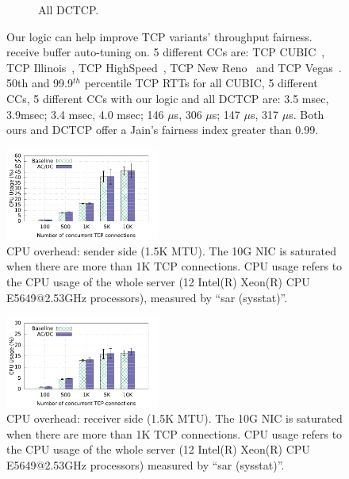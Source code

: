 \begin{figure}[!htb]
\begin{subfigure}[b]{0.24\textwidth}
                \caption{All DCTCP.}
                \label{fairness_5CC_with_ours}
        \end{subfigure}
	\caption{Our logic can help improve TCP variants' throughput fairness. 
		receive buffer auto-tuning on.	
		5 different CCs are: TCP CUBIC~\cite{ha2008cubic}, TCP Illinois~\cite{liu2008tcp}, 
		TCP HighSpeed~\cite{RFC3649}, 
		TCP New Reno~\cite{RFC3782} and TCP Vegas~\cite{Brakmo1994}.	     
		50th and 99.9$^{th}$ percentile TCP RTTs for all CUBIC, 5 different CCs, 5 different CCs with
		our logic and all DCTCP are: 3.5 msec, 3.9msec; 3.4 msec, 4.0 msec; 146 $\mu$s, 306 $\mu$s;
		147 $\mu$s, 317 $\mu$s. Both ours and DCTCP offer a Jain's fairness index greater than 0.99. }
 	\label{tput_fairness_coexistence}
\end{figure}	

\begin{figure}[!htb]
        \centering
  \includegraphics[width=0.45\textwidth]{figures/overhead/sender_15k_compare_cpu_witherrbar.pdf}
        \caption{CPU overhead: sender side (1.5K MTU). The 10G NIC is saturated when there are more than 1K TCP connections.
		CPU usage refers to the CPU usage of the whole server (12 Intel(R) Xeon(R) CPU E5649@2.53GHz processors), 
		measured by ``sar (sysstat)''.}
        \label{cpu_overhead_sender_15k}
\end{figure}

\begin{figure}[!htb]
        \centering
  \includegraphics[width=0.45\textwidth]{figures/overhead/receiver_15k_compare_cpu_witherrbar.pdf}
        \caption{CPU overhead: receiver side (1.5K MTU). The 10G NIC is saturated when there are more than 1K TCP connections.
		CPU usage refers to the CPU usage of the whole server (12 Intel(R) Xeon(R) CPU E5649@2.53GHz processors) 
		measured by ``sar (sysstat)''.}
        \label{cpu_overhead_receiver_15k}
\end{figure}

